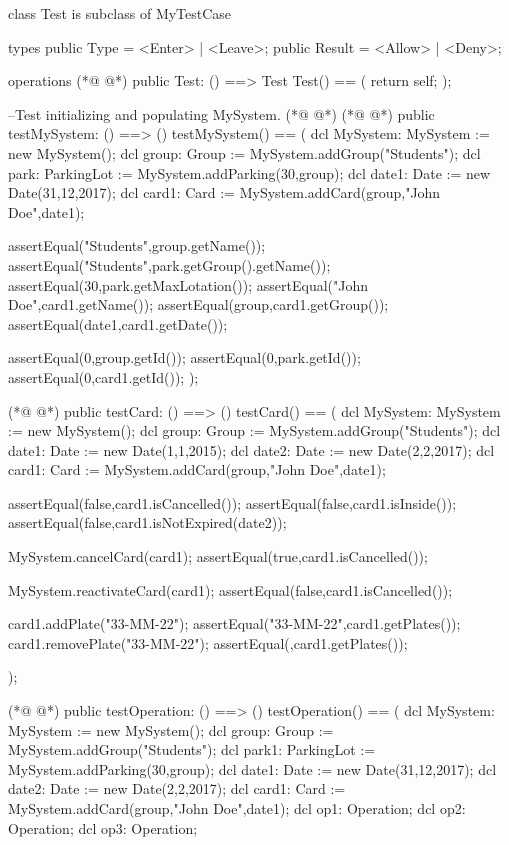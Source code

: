 \begin{vdmpp}[breaklines=true]
class Test is subclass of MyTestCase

types
public Type = <Enter> | <Leave>;
public Result = <Allow> | <Deny>;

operations
(*@
\label{Test:8}
@*)
public Test: () ==> Test
 Test() == (
  return self;
  );
  
--Test initializing and populating MySystem.
(*@
\label{testMySystem:14}
@*)
(*@
\label{testSystem:14}
@*)
public testMySystem: () ==> ()
 testMySystem() == (
  dcl MySystem: MySystem := new MySystem();
  dcl group: Group := MySystem.addGroup("Students");
  dcl park: ParkingLot := MySystem.addParking(30,group);
  dcl date1: Date := new Date(31,12,2017);
  dcl card1: Card := MySystem.addCard(group,"John Doe",date1);
  
  assertEqual("Students",group.getName());
  assertEqual("Students",park.getGroup().getName());
  assertEqual(30,park.getMaxLotation());
  assertEqual("John Doe",card1.getName());
  assertEqual(group,card1.getGroup());
  assertEqual(date1,card1.getDate());
  
  assertEqual(0,group.getId());
  assertEqual(0,park.getId());
  assertEqual(0,card1.getId());
 );
 
(*@
\label{testCard:34}
@*)
public testCard: () ==> ()
 testCard() == (
  dcl MySystem: MySystem := new MySystem();
  dcl group: Group := MySystem.addGroup("Students");
  dcl date1: Date := new Date(1,1,2015);
  dcl date2: Date := new Date(2,2,2017);
  dcl card1: Card := MySystem.addCard(group,"John Doe",date1);
  
  assertEqual(false,card1.isCancelled());
  assertEqual(false,card1.isInside());
  assertEqual(false,card1.isNotExpired(date2));
  
  
  MySystem.cancelCard(card1);
  assertEqual(true,card1.isCancelled());
  
  MySystem.reactivateCard(card1);
  assertEqual(false,card1.isCancelled());
  
  card1.addPlate("33-MM-22");
  assertEqual({"33-MM-22"},card1.getPlates());
  card1.removePlate("33-MM-22");
  assertEqual({},card1.getPlates());
  
 );
 
 
(*@
\label{testOperation:61}
@*)
public testOperation: () ==> ()
 testOperation() == (
  dcl MySystem: MySystem := new MySystem();
  dcl group: Group := MySystem.addGroup("Students");
  dcl park1: ParkingLot := MySystem.addParking(30,group);
  dcl date1: Date := new Date(31,12,2017);
  dcl date2: Date := new Date(2,2,2017);
  dcl card1: Card := MySystem.addCard(group,"John Doe",date1);
  dcl op1: Operation;
  dcl op2: Operation;
  dcl op3: Operation;
  

\end{vdmpp}
